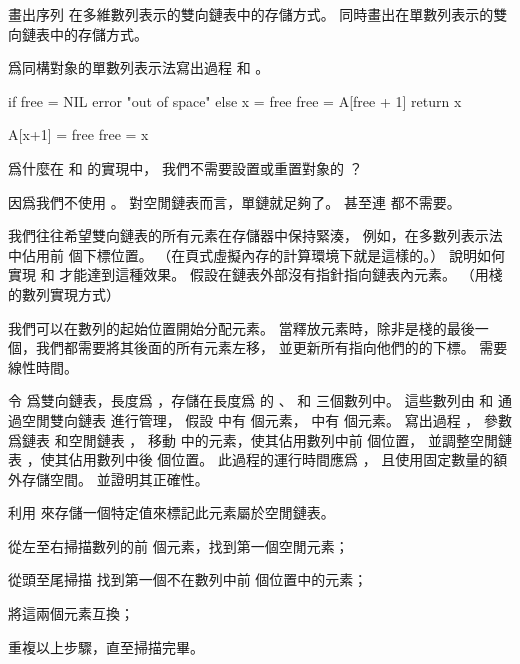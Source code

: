 \startsection[
  title={Implementing pointers and objects},
]

\startEXERCISE
畫出序列  在多維數列表示的雙向鏈表中的存儲方式。
同時畫出在單數列表示的雙向鏈表中的存儲方式。
\stopEXERCISE

\startANSWER
\externalfigure[output/e10_3_1-1]

\externalfigure[output/e10_3_1-2]
\stopANSWER

\startEXERCISE
爲同構對象的單數列表示法寫出過程  和 。
\stopEXERCISE

\startANSWER
{}
\startCLRS
if free = NIL
	error "out of space"
else
	x = free
	free = A[free + 1]
	return x
\stopCLRS

\startCLRS
A[x+1] = free
free = x
\stopCLRS
\stopANSWER

\startEXERCISE
爲什麼在  和  的實現中，
我們不需要設置或重置對象的 ？
\stopEXERCISE

\startANSWER
因爲我們不使用 。
對空閒鏈表而言，單鏈就足夠了。
甚至連  都不需要。
\stopANSWER

我們往往希望雙向鏈表的所有元素在存儲器中保持緊湊，
例如，在多數列表示法中佔用前  個下標位置。
（在頁式虛擬內存的計算環境下就是這樣的。）
說明如何實現  和  才能達到這種效果。
假設在鏈表外部沒有指針指向鏈表內元素。
（\hint 用棧的數列實現方式）
\stopEXERCISE

\startANSWER
我們可以在數列的起始位置開始分配元素。
當釋放元素時，除非是棧的最後一個，我們都需要將其後面的所有元素左移，
並更新所有指向他們的的下標。
需要線性時間。
\stopANSWER

\startEXERCISE
令  爲雙向鏈表，長度爲 ，存儲在長度爲  的 、  和  三個數列中。
這些數列由  和  通過空閒雙向鏈表  進行管理，
假設  中有  個元素，  中有  個元素。
寫出過程 ，
參數爲鏈表  和空閒鏈表 ，
移動  中的元素，使其佔用數列中前  個位置，
並調整空閒鏈表 ，使其佔用數列中後  個位置。
此過程的運行時間應爲 ，
且使用固定數量的額外存儲空間。
並證明其正確性。
\stopEXERCISE

\startEXERCISE
利用  來存儲一個特定值來標記此元素屬於空閒鏈表。
\startigBase[n]
\item 從左至右掃描數列的前  個元素，找到第一個空閒元素；
\item 從頭至尾掃描  找到第一個不在數列中前  個位置中的元素；
\item 將這兩個元素互換；
\item 重複以上步驟，直至掃描完畢。
\stopigBase
\stopEXERCISE

\stopsection

